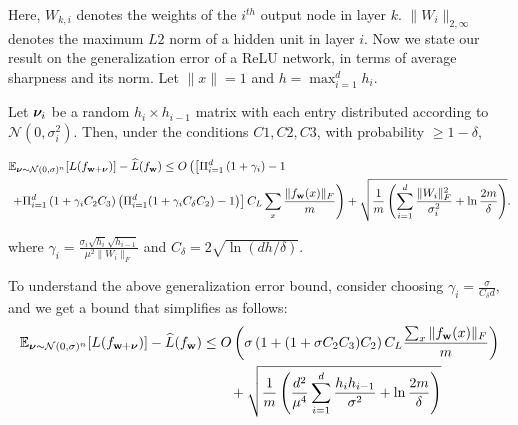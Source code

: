 \documentclass{article}
\begin{document}
Here, $W_{k, i}$ denotes the weights of the $i^{th}$ output node in layer $k$. $\| W_{i}\|_{2,\infty}$ denotes the maximum $L2$ norm of a hidden unit in layer $i$. Now we state our result on the generalization error of a ReLU network, in terms of average sharpness and its norm. Let $\|x\| = 1$ and $h=\max_{i=1}^d h_i$. 

\begin{thm}\label{thm:relu}
Let $\boldsymbol{\nu}_i$ be a random $h_i \times h_{i-1}$ matrix with each entry distributed according to $\mathcal{N}(0,\sigma_i^2)$. Then, under the conditions $C1, C2, C3$,  with probability $\geq 1-\delta$, 
\begin{small}
\begin{align*}
&\mathbb{E}_{\boldsymbol{\nu} \sim \mathcal{N}(0,\sigma)^n} [L(f_{\mathbf{w}+\boldsymbol{\nu}})] - \widehat{L}(f_{\mathbf{w}}) \leq O \left( \left[\Pi_{i=1}^d \left(1+\gamma_i \right) -1 \right. \right. \\ & \left. \left. + \Pi_{i=1}^d \left( 1+\gamma_i C_2 C_3 \right)\left(\Pi_{i=1}^d (1+ \gamma_i  C_{\delta} C_2)- 1\right) \right] C_{L} \sum_x \frac{\|f_{\mathbf{w}}(x)\|_F}{m} \right)+ \sqrt{\frac{1}{m}\left(\sum_{i=1}^d \frac{\|W_i\|_F^2 }{\sigma_i^2 } +  \ln \frac{2m}{\delta} \right)}.
\end{align*}
\end{small}
where $\gamma_i = \frac{\sigma_i \sqrt{h_i} \sqrt{h_{i-1}}}{\mu^2 \|W_i\|_F}$ and $C_{\delta}=2\sqrt{\ln(dh/\delta)} $.
\end{thm}


To understand the above generalization error bound,  consider choosing $\gamma_i =\frac{\sigma}{C_{\delta}d}$, and we get a bound that simplifies as follows:
\begin{align*}
 \mathbb{E}_{\boldsymbol{\nu} \sim \mathcal{N}(0,\sigma)^n} [L(f_{\mathbf{w}+\boldsymbol{\nu}})] - \widehat{L}(f_{\mathbf{w}}) & \leq O \left(  \sigma \left( 1 + (1+ \sigma C_2 C_3)  C_2 \right) C_L \frac{\sum_x\|f_{\mathbf{w}}(x)\|_F}{m} \right)  \\ & \quad \quad+  \sqrt{\frac{1}{m}\left(\frac{d^2}{ \mu^4}\sum_{i=1}^d  \frac{h_i h_{i-1} }{\sigma^2}+  \ln \frac{2m}{\delta} \right)}
\end{align*}
\end{document}
